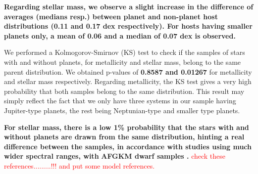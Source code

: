\documentclass[structabstract]{aa}
\begin{document}
\textbf{Regarding stellar mass, we observe a slight increase in the difference of averages (medians resp.) between planet and non-planet host distributions (0.11 and 0.17 dex respectively). For hosts having smaller planets only, a mean of 0.06 and a median of 0.07 dex is observed.}


We performed a Kolmogorov-Smirnov (KS) test to check if the samples of stars with and without planets, for metallicity and stellar mass, belong to the same parent distribution. We obtained p-values of \textbf{0.8587 and 0.01267} for metallicity and stellar mass respectively.  Regarding metallicity, the KS test gives a very high probability that both samples belong to the same distribution. This result may simply reflect the fact that we only have three systems in our sample having Jupiter-type planets, the rest being Neptunian-type and smaller type planets.








\textbf{For stellar mass, there is a low 1\% probability that the stars with and without planets are drawn from the same distribution, hinting a \textbf{real} difference between the samples, in accordance with studies using much wider spectral ranges, with}
\textbf{AFGKM dwarf samples \citep{Laws-2003,Lovis-2007,Johnson-2010}.} \textcolor{red}{check these references.........!!! and put some model references.} %



\end{document}
